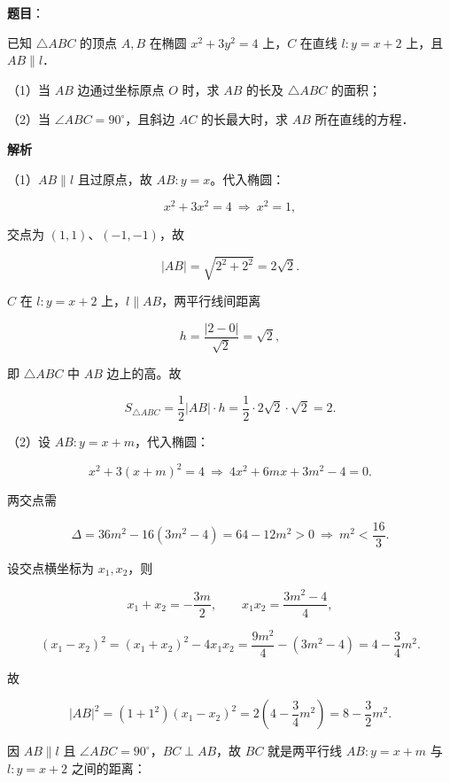 \begin{answer}

\textbf{题目}：

已知 $\triangle ABC$ 的顶点 $A,B$ 在椭圆 $x^2+3y^2=4$ 上，$C$ 在直线 $l:y=x+2$ 上，且 $AB\parallel l$．

（1）当 $AB$ 边通过坐标原点 $O$ 时，求 $AB$ 的长及 $\triangle ABC$ 的面积；

（2）当 $\angle ABC=90^\circ$，且斜边 $AC$ 的长最大时，求 $AB$ 所在直线的方程．

\textbf{解析}

（1）$AB\parallel l$ 且过原点，故 $AB:y=x$。代入椭圆：

\nopagebreak[4]
\[x^2+3x^2=4\ \Longrightarrow\ x^2=1,\]

交点为 $(1,1)$、$(-1,-1)$，故

\nopagebreak[4]
\[|AB|=\sqrt{2^2+2^2}=2\sqrt2 .\]

$C$ 在 $l:y=x+2$ 上，$l\parallel AB$，两平行线间距离

\nopagebreak[4]
\[h=\frac{|2-0|}{\sqrt2}=\sqrt2,\]

即 $\triangle ABC$ 中 $AB$ 边上的高。故

\nopagebreak[4]
\[S_{\triangle ABC}=\frac12|AB|\cdot h=\frac12\cdot2\sqrt2\cdot\sqrt2=2 .\]

（2）设 $AB:y=x+m$，代入椭圆：

\nopagebreak[4]
\[x^2+3(x+m)^2=4\ \Longrightarrow\ 4x^2+6mx+3m^2-4=0 .\]

两交点需

\nopagebreak[4]
\[\Delta=36m^2-16(3m^2-4)=64-12m^2>0\ \Longrightarrow\ m^2<\frac{16}{3}.\]

设交点横坐标为 $x_1,x_2$，则

\nopagebreak[4]
\[x_1+x_2=-\frac{3m}{2},\qquad x_1x_2=\frac{3m^2-4}{4},\]

\nopagebreak[4]
\[(x_1-x_2)^2=(x_1+x_2)^2-4x_1x_2=\frac{9m^2}{4}-(3m^2-4)=4-\frac34m^2 .\]

故

\nopagebreak[4]
\[|AB|^2=(1+1^2)(x_1-x_2)^2=2\left(4-\frac34m^2\right)=8-\frac32m^2 .\]

因 $AB\parallel l$ 且 $\angle ABC=90^\circ$，$BC\perp AB$，故 $BC$ 就是两平行线 $AB:y=x+m$ 与 $l:y=x+2$ 之间的距离：


\end{answer}
